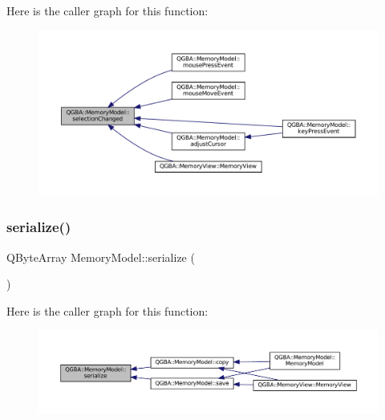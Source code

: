 Here is the caller graph for this function\+:
\nopagebreak
\begin{figure}[H]
\begin{center}
\leavevmode
\includegraphics[width=350pt]{class_q_g_b_a_1_1_memory_model_a0fa24be2f52e936661ef0923c4ed77f5_icgraph}
\end{center}
\end{figure}
\mbox{\label{class_q_g_b_a_1_1_memory_model_a5fa79afa48814fc6acd209be3db283c4}} 
\subsubsection{\texorpdfstring{serialize()}{serialize()}}
{\footnotesize\ttfamily Q\+Byte\+Array Memory\+Model\+::serialize (\begin{DoxyParamCaption}{ }\end{DoxyParamCaption})}

Here is the caller graph for this function\+:
\nopagebreak
\begin{figure}[H]
\begin{center}
\leavevmode
\includegraphics[width=350pt]{class_q_g_b_a_1_1_memory_model_a5fa79afa48814fc6acd209be3db283c4_icgraph}
\end{center}
\end{figure}
\mbox{\label{class_q_g_b_a_1_1_memory_model_a2bc5b85020957b515fc011bba99d940f}} 
